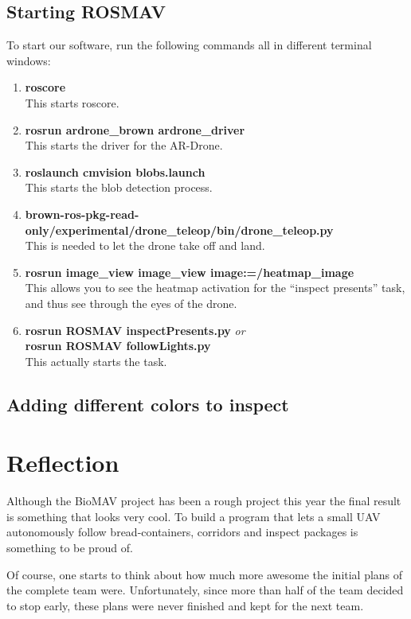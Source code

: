 \documentclass[a4paper,10pt]{article}
\begin{document}
\subsection{Starting ROSMAV}
To start our software, run the following commands all in different terminal windows:
\begin{enumerate}
\item \textbf{roscore} \\ This starts roscore.
\item \textbf{rosrun ardrone\_brown ardrone\_driver} \\ This starts the driver for the AR-Drone.
\item \textbf{roslaunch cmvision blobs.launch} \\ This starts the blob detection process.
\item \textbf{brown-ros-pkg-read-only/experimental/drone\_teleop/bin/drone\_teleop.py} \\ This is needed to let the drone take off and land.
\item \textbf{rosrun image\_view image\_view image:=/heatmap\_image} \\ This
      allows you to see the heatmap activation for the ``inspect presents''
      task, and thus see through the eyes of the drone.
\item \textbf{rosrun ROSMAV inspectPresents.py} \textit{or} \\
      \textbf{rosrun ROSMAV followLights.py} \\
      This actually starts the task. 
\end{enumerate}
\subsection{Adding different colors to inspect}

\section{Reflection}

Although the BioMAV project has been a rough project this year the final result is something that looks very cool. 
To build a program that lets a small UAV autonomously follow bread-containers, corridors and inspect packages is something to be proud of. 

Of course, one starts to think about how much more awesome the initial plans of the complete team were. 
Unfortunately, since more than half of the team decided to stop early, these plans were never finished and kept for the next team. 
\end{document}

